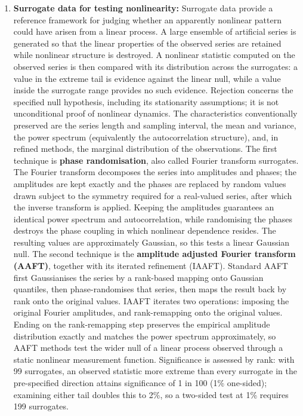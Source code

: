 \documentclass[conference]{IEEEtran}
\begin{document}
\begin{enumerate}
    \item \textbf{Surrogate data for testing nonlinearity:} Surrogate data provide a reference framework for judging whether an apparently nonlinear pattern could have arisen from a linear process. A large ensemble of artificial series is generated so that the linear properties of the observed series are retained while nonlinear structure is destroyed. A nonlinear statistic computed on the observed series is then compared with its distribution across the surrogates: a value in the extreme tail is evidence against the linear null, while a value inside the surrogate range provides no such evidence. Rejection concerns the specified null hypothesis, including its stationarity assumptions; it is not unconditional proof of nonlinear dynamics. The characteristics conventionally preserved are the series length and sampling interval, the mean and variance, the power spectrum (equivalently the autocorrelation structure), and, in refined methods, the marginal distribution of the observations. The first technique is \textbf{phase randomisation}, also called Fourier transform surrogates. The Fourier transform decomposes the series into amplitudes and phases; the amplitudes are kept exactly and the phases are replaced by random values drawn subject to the symmetry required for a real-valued series, after which the inverse transform is applied. Keeping the amplitudes guarantees an identical power spectrum and autocorrelation, while randomising the phases destroys the phase coupling in which nonlinear dependence resides. The resulting values are approximately Gaussian, so this tests a linear Gaussian null. The second technique is the \textbf{amplitude adjusted Fourier transform (AAFT)}, together with its iterated refinement (IAAFT). Standard AAFT first Gaussianises the series by a rank-based mapping onto Gaussian quantiles, then phase-randomises that series, then maps the result back by rank onto the original values. IAAFT iterates two operations: imposing the original Fourier amplitudes, and rank-remapping onto the original values. Ending on the rank-remapping step preserves the empirical amplitude distribution exactly and matches the power spectrum approximately, so AAFT methods test the wider null of a linear process observed through a static nonlinear measurement function. Significance is assessed by rank: with 99 surrogates, an observed statistic more extreme than every surrogate in the pre-specified direction attains significance of 1 in 100 (1\% one-sided); examining either tail doubles this to 2\%, so a two-sided test at 1\% requires 199 surrogates.


\end{enumerate}
\end{document}
